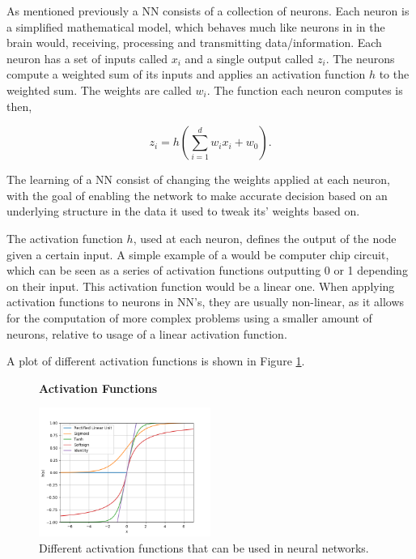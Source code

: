 As mentioned previously a \gls{NN} consists of a collection of neurons. Each
neuron is a simplified mathematical model, which behaves much like neurons in in
the brain would, receiving, processing and transmitting data/information. Each
neuron has a set of inputs called $x_i$ and a single output called $z_i$. The
neurons compute a weighted sum of its inputs and applies an activation function
$h$ to the weighted sum. The weights are called $w_i$. The function each neuron
computes is then,

\begin{equation}
    z_i = h\left(
        \sum_{i = 1}^d w_ix_i + w_0
    \right).
\end{equation}

The learning of a \gls{NN} consist of changing the weights applied at each
neuron, with the goal of enabling the network to make accurate decision
based on an underlying structure in the data it used to tweak its' weights
based on.

The activation function $h$, used at each neuron, defines the output of the
node given a certain input. A simple example of a would be computer chip
circuit, which can be seen as a series of activation functions outputting 0 or
1 depending on their input. This activation function would be a linear one.
When applying activation functions to neurons in \gls{NN}'s, they are usually
non-linear, as it allows for the computation of more complex problems using a
smaller amount of neurons, relative to usage of a linear activation function.

A plot of different activation functions is shown in Figure
\ref{fig:activation_functions}.

\begin{figure}
    \centering
    \textbf{Activation Functions}\par\medskip
    \includegraphics[width=0.5\textwidth]{./pictures/method/activation_functions.png}
    \caption{Different activation functions that can be used in neural
        networks.}
    \label{fig:activation_functions}
\end{figure}

